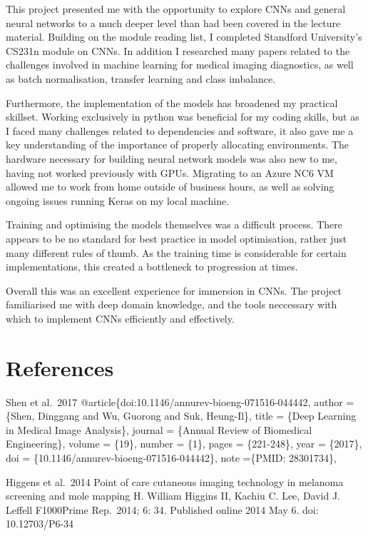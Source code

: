 \documentclass[11pt]{article}
\begin{document}
This project presented me with the opportunity to explore CNNs and
general neural networks to a much deeper level than had been covered in
the lecture material. Building on the module reading list, I completed
Standford University's CS231n module on CNNs. In addition I researched
many papers related to the challenges involved in machine learning for
medical imaging diagnostics, as well as batch normalisation, transfer
learning and class imbalance.

Furthermore, the implementation of the models has broadened my practical
skillset. Working exclusively in python was beneficial for my coding
skills, but as I faced many challenges related to dependencies and
software, it also gave me a key understanding of the importance of
properly allocating environments. The hardware necessary for building
neural network models was also new to me, having not worked previously
with GPUs. Migrating to an Azure NC6 VM allowed me to work from home
outside of business hours, as well as solving ongoing issues running
Keras on my local machine.

Training and optimising the models themselves was a difficult process.
There appears to be no standard for best practice in model optimisation,
rather just many different rules of thumb. As the training time is
considerable for certain implementations, this created a bottleneck to
progression at times.

Overall this was an excellent experience for immersion in CNNs. The
project familiarised me with deep domain knowledge, and the tools
neccessary with which to implement CNNs efficiently and effectively.

    \hypertarget{references}{%
\section{References}\label{references}}

Shen et al.~2017 @article\{doi:10.1146/annurev-bioeng-071516-044442,
author = \{Shen, Dinggang and Wu, Guorong and Suk, Heung-Il\}, title =
\{Deep Learning in Medical Image Analysis\}, journal = \{Annual Review
of Biomedical Engineering\}, volume = \{19\}, number = \{1\}, pages =
\{221-248\}, year = \{2017\}, doi =
\{10.1146/annurev-bioeng-071516-044442\}, note =\{PMID: 28301734\},

Higgens et al.~2014 Point of care cutaneous imaging technology in
melanoma screening and mole mapping H. William Higgins II, Kachiu C.
Lee, David J. Leffell F1000Prime Rep.~2014; 6: 34. Published online 2014
May 6. doi: 10.12703/P6-34
\end{document}
